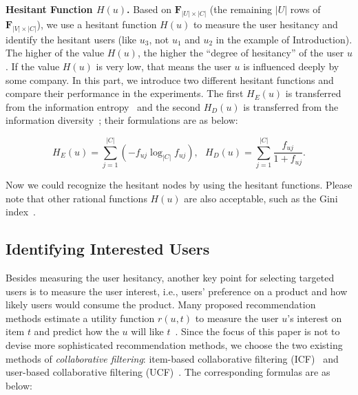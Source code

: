 \documentclass{llncs}
\begin{document}
\textbf{Hesitant Function $H(u)$. }
Based on $\mathbf{F} _{|U| \times |C|}$ (the remaining $|U|$ rows of  $\mathbf{F} _{|V| \times |C|}$), we use a hesitant function $H(u)$ to measure the user hesitancy and identify the hesitant users (like $u_3$, not $u_1$ and $u_2$ in the example of Introduction). %
The higher of the value $H(u)$, the higher the ``degree of hesitancy'' of the user $u$. If the value $H(u)$ is very low, that means the user $u$ is influenced deeply by some company.
In this part, we introduce two different hesitant functions and  compare their performance in the experiments.
The first $H_{E}(u)$ is transferred from the information entropy~\cite{pang2006introduction} and the second $H_{D}(u)$ is transferred from the information diversity~\cite{tang2014diversified}; their formulations are as below:

\vspace*{-0.3cm}
\begin{small}{
$$H_{E}(u)= \sum _{j=1} ^{|C|} (- f_{uj}\log _{|C|} f_{uj}),~~~H_{D}(u)=\sum _{j=1} ^{|C|} \frac{f_{uj}} {1+f_{uj}}.$$
}\end{small}
\vspace*{-0.3cm}

Now we could recognize the hesitant nodes by using the hesitant functions.
Please note that other rational functions $H(u)$ are also acceptable, such as the Gini index~\cite{pang2006introduction}.



\vspace*{-0.3cm}
\subsection{Identifying Interested Users}
\vspace*{-0.2cm}
Besides measuring the user hesitancy, another key point for selecting targeted users is to measure the user interest, i.e., users' preference on a product and how likely users would consume the product.
Many proposed recommendation methods estimate a utility function $r(u,t)$ to measure the user $u$'s interest on item $t$ and predict how the $u$ will like $t$~\cite{cf2009survey}. 
Since the focus of this paper is not to devise more sophisticated recommendation methods, we choose the two existing methods of \emph{collaborative filtering}: item-based collaborative filtering (ICF)~\cite{deshpande2004item} and user-based collaborative filtering (UCF)~\cite{cf2009survey}.  The corresponding formulas are as below:
\end{document}
